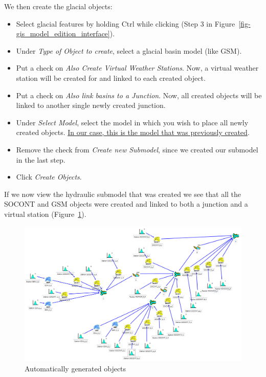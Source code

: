 \documentclass[
  letterpaper,
  DIV=11,
  numbers=noendperiod]{scrreprt}
\begin{document}
We then create the glacial objects:

\begin{itemize}
\item
  {Select glacial features by holding Ctrl while clicking (Step 3 in
  Figure~\ref{fig-gis_model_edition_interface}).}
\item
  {Under \emph{Type of Object to create}, select a glacial basin model
  (like GSM).}
\item
  {Put a check on \emph{Also Create Virtual Weather Stations}.} Now, a
  virtual weather station will be created for and linked to each created
  object.
\item
  {Put a check on \emph{Also link basins to a Junction}.} Now, all
  created objects will be linked to another single newly created
  junction.
\item
  {Under \emph{Select Model}, select the model in which you wish to
  place all newly created objects. \uline{In our case, this is the model
  that was previously created}.}
\item
  {Remove the check from \emph{Create new Submodel}, since we created
  our submodel in the last step.}
\item
  {Click \emph{Create Objects}.}
\end{itemize}

If we now view the hydraulic submodel that was created we see that all
the SOCONT and GSM objects were created and linked to both a junction
and a virtual station
(Figure~\ref{fig-gis_automatic_generated_objects}).

\begin{figure}

{\centering \includegraphics{./figures/fig-gis_automatic_generated_objects.png}

}

\caption{\label{fig-gis_automatic_generated_objects}Automatically
generated objects}

\end{figure}
\end{document}
